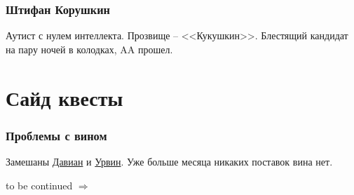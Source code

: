 \documentclass[letterpaper,twocolumn,openany,nodeprecatedcode]{dndbook}
\begin{document}
\section{Штифан Корушкин}
Аутист с нулем интеллекта. Прозвище -- <<Кукушкин>>. Блестящий кандидат на пару ночей в колодках, AA прошел.

\part{Сайд квесты}

\section{Проблемы с вином}\label{sec:wine_problems}

Замешаны \hyperref[sec:davian_martyakov]{Давиан} и \hyperref[sec:urvin]{Урвин}. Уже больше месяца никаких поставок вина нет.

\begin{english}
\LARGE to be continued $\Rightarrow$
\end{english}
\end{document}
